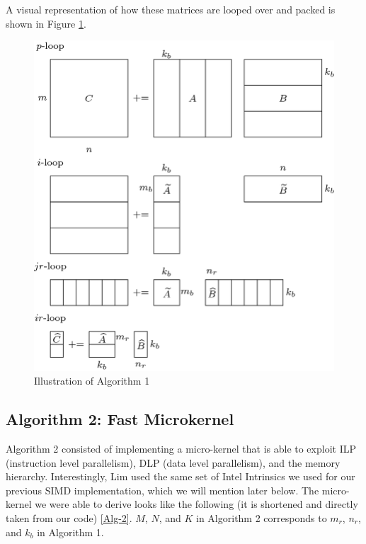 \documentclass{article}
\begin{document}
A visual representation of how these matrices are looped over and packed is shown in Figure \ref{fig:algo}.

\begin{figure}[H]
	\centerline{\includegraphics[width=6in]{figures/Illustration-of-Algorithm-1.png}}
	\caption{Illustration of Algorithm 1 \cite{10.1007/s10586-018-2810-y}}
	\label{fig:algo}
\end{figure}

\subsection{Algorithm 2: Fast Microkernel}
Algorithm 2 consisted of implementing a micro-kernel that is able to exploit ILP (instruction level parallelism), DLP (data level parallelism), and the memory hierarchy. Interestingly, Lim \cite{10.1007/s10586-018-2810-y} used the same set of Intel Intrinsics we used for our previous SIMD implementation, which we will mention later below. The micro-kernel we were able to derive looks like the following (it is shortened and directly taken from our code) \ref{Alg-2}. $M$, $N$, and $K$ in Algorithm 2 corresponds to $m_r$, $n_r$, and $k_b$ in Algorithm 1.
\end{document}
